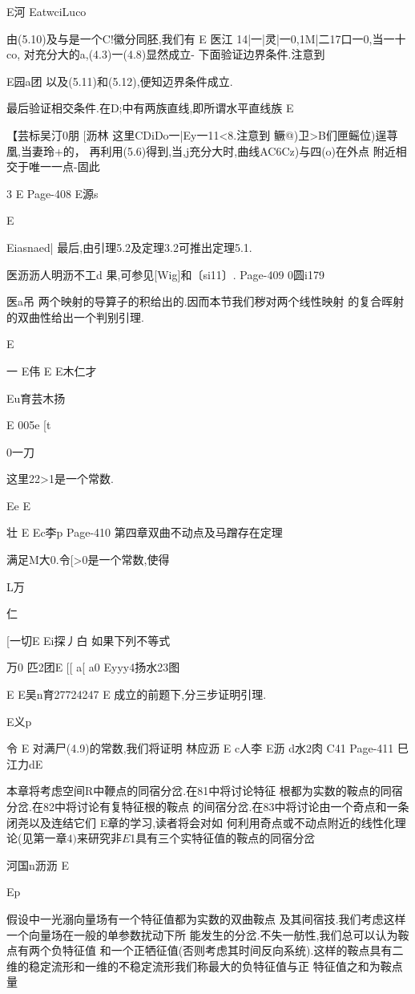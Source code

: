 {{{{{{{{{E河
EatwciLuco

由(5.10)及与是一个C!徽分同胚,我们有
E
医江
14|一|灵|一0,1M|二17口一0,当一十co,
对充分大的a,(4.3)一(4.8)显然成立-
下面验证边界条件.注意到

E园a团
以及(5.11)和(5.12),便知迈界条件成立.

最后验证相交条件.在D;中有两族直线,即所谓水平直线族
E

【芸标吴汀0朋
[沥林
这里CDiDo一{|Ey一11<8}.注意到
鳜@)卫>B们匣鳐位)逞荨凰,当妻玲+的，
再利用(5.6)得到,当,j充分大时,曲线AC6Cz)与四(o)在外点
附近相交于唯一一点-固此

3
E
Page-408
E源s

E

Eiasnaed|
最后,由引理5.2及定理3.2可推出定理5.1.

医沥沥人明沥不工d
果,可参见[Wig]和〔si11〕.
Page-409
0圆i179

医a吊
两个映射的导算子的积给出的.因而本节我们秽对两个线性映射
的复合晖射的双曲性给出一个判别引理.

E

一
E伟
E
E木仁才

Eu育芸木扬

E
005e
[t

0一刀

这里22>1是一个常数.

Ee
E

壮
E
Ec李p
Page-410
第四章双曲不动点及马蹭存在定理

满足M大0.令[>0是一个常数,使得

L万

仁

[一切E
Ei探丿白
如果下列不等式

万0
匹2团E
[[
a[
a0
Eyyy4扬水23图

E
E吴n育27724247
E
成立的前题下,分三步证明引理.

E义p

令
E
对满尸(4.9)的常数,我们将证明
林应沥
E
c人李
E沥
d水2肉
C41
Page-411
巳江力dE

本章将考虑空间R中鞭点的同宿分岔.在81中将讨论特征
根都为实数的鞍点的同宿分岔.在82中将讨论有复特征根的鞍点
的间宿分岔.在83中将讨论由一个奇点和一条闭尧以及连结它们
E章的学习,读者将会对如
何利用奇点或不动点附近的线性化理论(见第一章$4)来研究非
E

$1具有三个实特征值的鞍点的同宿分岔

河国n沥沥
E

Ep

假设中一光溺向量场有一个特征值都为实数的双曲鞍点
及其间宿技.我们考虑这样一个向量场在一般的单参数扰动下所
能发生的分岔.不失一舫性,我们总可以认为鞍点有两个负特征值
和一个正牺征值(否则考虑其时间反向系统).这样的鞍点具有二
维的稳定流形和一维的不稳定流形我们称最大的负特征值与正
特征值之和为鞍点量

}}}}}}}}}
